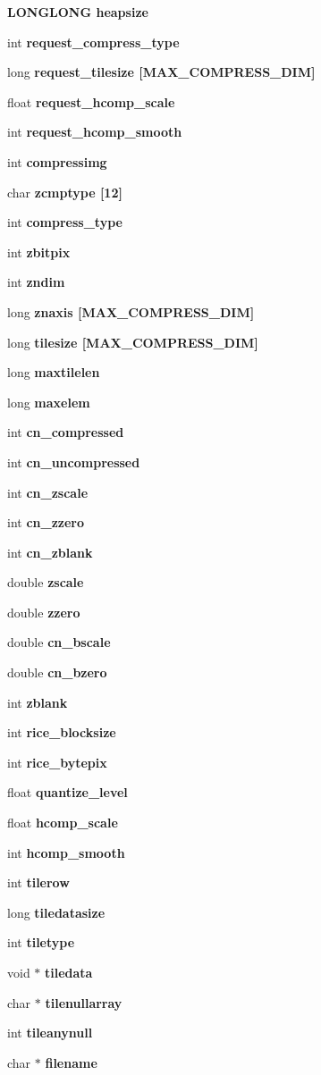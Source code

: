 \begin{CompactItemize}
\bf{LONGLONG} \bf{heapsize}
\item 
int \bf{request\_\-compress\_\-type}
\item 
long \bf{request\_\-tilesize} [MAX\_\-COMPRESS\_\-DIM]
\item 
float \bf{request\_\-hcomp\_\-scale}
\item 
int \bf{request\_\-hcomp\_\-smooth}
\item 
int \bf{compressimg}
\item 
char \bf{zcmptype} [12]
\item 
int \bf{compress\_\-type}
\item 
int \bf{zbitpix}
\item 
int \bf{zndim}
\item 
long \bf{znaxis} [MAX\_\-COMPRESS\_\-DIM]
\item 
long \bf{tilesize} [MAX\_\-COMPRESS\_\-DIM]
\item 
long \bf{maxtilelen}
\item 
long \bf{maxelem}
\item 
int \bf{cn\_\-compressed}
\item 
int \bf{cn\_\-uncompressed}
\item 
int \bf{cn\_\-zscale}
\item 
int \bf{cn\_\-zzero}
\item 
int \bf{cn\_\-zblank}
\item 
double \bf{zscale}
\item 
double \bf{zzero}
\item 
double \bf{cn\_\-bscale}
\item 
double \bf{cn\_\-bzero}
\item 
int \bf{zblank}
\item 
int \bf{rice\_\-blocksize}
\item 
int \bf{rice\_\-bytepix}
\item 
float \bf{quantize\_\-level}
\item 
float \bf{hcomp\_\-scale}
\item 
int \bf{hcomp\_\-smooth}
\item 
int \bf{tilerow}
\item 
long \bf{tiledatasize}
\item 
int \bf{tiletype}
\item 
void $\ast$ \bf{tiledata}
\item 
char $\ast$ \bf{tilenullarray}
\item 
int \bf{tileanynull}
\item 
char $\ast$ \bf{filename}
\item 

\end{CompactItemize}
